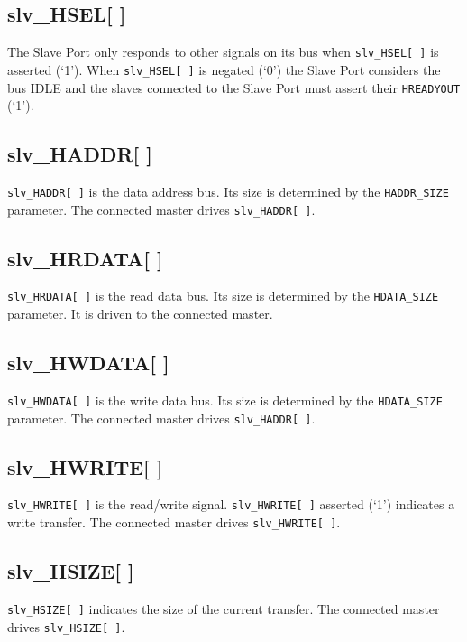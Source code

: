 \subsection{slv\_HSEL[ ]}\label{slv_hsel}

The Slave Port only responds to other signals on its bus when \texttt{slv\_HSEL[\,]} is
asserted (`1'). When \texttt{slv\_HSEL[\,]} is negated (`0') the Slave Port
considers the bus IDLE and the slaves connected to the Slave Port must assert their
\texttt{HREADYOUT} (`1').

\subsection{slv\_HADDR[ ]}\label{slv_haddr}

\texttt{slv\_HADDR[\,]} is the data address bus. Its size is determined by the
\texttt{HADDR\_SIZE} parameter. The connected master drives \texttt{slv\_HADDR[\,]}.

\subsection{slv\_HRDATA[ ]}\label{slv_hrdata}

\texttt{slv\_HRDATA[ ]} is the read data bus. Its size is determined by the
\texttt{HDATA\_SIZE} parameter. It is driven to the connected master.

\subsection{slv\_HWDATA[ ]}\label{slv_hwdata}

\texttt{slv\_HWDATA[\,]} is the write data bus. Its size is determined by the
\texttt{HDATA\_SIZE} parameter. The connected master drives \texttt{slv\_HADDR[\,]}.

\subsection{slv\_HWRITE[ ]}\label{slv_hwrite}

\texttt{slv\_HWRITE[\,]} is the read/write signal. \texttt{slv\_HWRITE[\,]} asserted (`1') indicates a
write transfer. The connected master drives \texttt{slv\_HWRITE[\,]}.

\subsection{slv\_HSIZE[ ]}\label{slv_hsize}

\texttt{slv\_HSIZE[\,]} indicates the size of the current transfer. The connected
master drives \texttt{slv\_HSIZE[\,]}.

